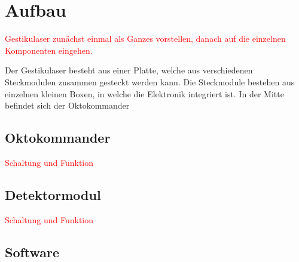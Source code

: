 \chapter{Aufbau}
\label{ch:Funktionsweise und Aufbau}

\textcolor{red}{Gestikulaser zunächst einmal als Ganzes vorstellen, danach auf die einzelnen Komponenten eingehen.}

Der Gestikulaser besteht aus einer Platte, welche aus verschiedenen Steckmodulen zusammen gesteckt werden kann. Die Steckmodule bestehen aus einzelnen kleinen Boxen, in welche die Elektronik integriert ist. 
In der Mitte befindet sich der Oktokommander


\section{Oktokommander}
\label{sec:Oktokommander}

\textcolor{red}{Schaltung und Funktion}


\section{Detektormodul}
\label{sec:Detektormodul}

\textcolor{red}{Schaltung und Funktion}


\section{Software}
\label{sec:Software}